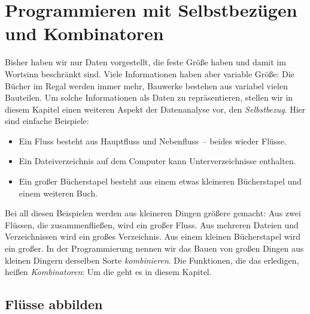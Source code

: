 
\chapter{Programmieren mit Selbstbezügen und Kombinatoren}
\label{cha:selbstbezug}

Bisher haben wir nur Daten vorgestellt, die
feste Größe haben und damit im Wortsinn beschränkt sind.  Viele
Informationen haben aber variable Größe: Die Bücher im Regal werden
immer mehr, Bauwerke bestehen aus variabel vielen Bauteilen.  Um
solche Informationen als Daten zu repräsentieren, stellen wir in
diesem Kapitel einen weiteren Aspekt der Datenanalyse vor, den
\textit{Selbstbezug}.  Hier sind einfache
Beispiele:
%
\begin{itemize}
\item Ein Fluss besteht aus Hauptfluss und Nebenfluss~-- beides wieder
  Flüsse.
\item Ein Dateiverzeichnis auf dem Computer kann 
  Unterverzeichnisse enthalten.
\item Ein großer Bücherstapel besteht aus einem etwas kleineren
  Bücherstapel und einem weiteren Buch.
\end{itemize}
%
Bei all diesen Beispielen werden aus kleineren Dingen größere gemacht:
Aus zwei Flüssen, die zusammenfließen, wird ein großer Fluss.  Aus
mehreren Dateien und Verzeichnissen wird ein großes Verzeichnis.  Aus
einem kleinen Bücherstapel wird ein großer.  In der Programmierung
nennen wir das Bauen von großen Dingen aus kleinen Dingern derselben
Sorte \textit{kombinieren}. Die Funktionen, die das erledigen, heißen
\textit{Kombinatoren}: Um die geht es in diesem Kapitel.

\section{Flüsse abbilden}

